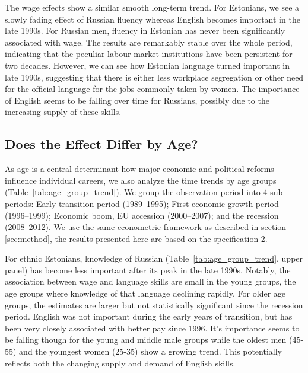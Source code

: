 \documentclass[12pt, a4paper]{article}
\begin{document}
The wage effects show a similar smooth long-term trend.  For Estonians, we
see a slowly fading effect of Russian fluency whereas
English becomes important in the late 1990s.  For Russian men, fluency in Estonian
has never been significantly associated with wage.
The results are remarkably stable over the whole period, indicating
that the peculiar labour market institutions have been persistent for
two decades.  However, we can see how Estonian language turned
important in late 1990s, suggesting that there is either less
workplace segregation or other need for the official language for
the jobs commonly taken by women.  The
importance of English seems to be falling over time for Russians, possibly
due to the increasing supply of these skills. 


\subsection{Does the Effect Differ by Age?}
\label{sec:age_groups}
As age is a central determinant how major economic and political
reforms influence individual careers, 
we also analyze the time trends by age groups
(Table~\ref{tab:age_group_trend}).
We group the observation period into 4 sub-periods: Early transition period
(1989--1995); First economic growth period (1996--1999);
Economic boom, EU accession (2000--2007); and the recession
(2008--2012).
We use the same econometric framework as described in section
\ref{sec:method}, the results presented here are based on the specification 2.

For ethnic Estonians, knowledge of Russian
(Table~\ref{tab:age_group_trend}, upper panel) has become less
important after its peak in the late 1990s. Notably, the
association between wage and language skills are small in the
young groups, the age groups where knowledge of that language
declining rapidly.
For older age groups, the estimates are larger but not statistically
significant since the recession period.  English was not important
during the early years of transition, but has been very closely
associated with better pay since 1996.  It's importance seems to be
falling though for the young and middle male groups while the oldest men
(45-55) and the youngest women (25-35) show a growing trend.
This potentially reflects both the changing supply and demand of
English skills.
\end{document}
